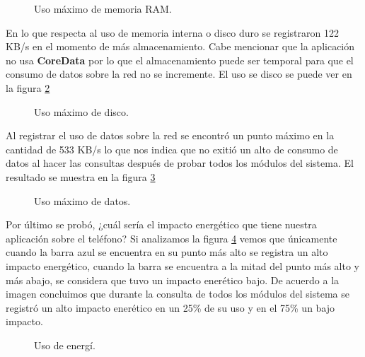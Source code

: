     \begin{figure}[h!]
	\begin{center}
		\caption{Uso máximo de memoria RAM. \label{fig:memoria}}
	\end{center}
\end{figure}

En lo que respecta al uso de memoria interna o disco duro se registraron 122 KB/s en el momento de más almacenamiento. Cabe mencionar que la aplicación no usa \textbf{CoreData} por lo que el almacenamiento puede ser temporal para que el consumo de datos sobre la red no se incremente. El uso se disco se puede ver en la figura \ref{fig:disco} 

    \begin{figure}[h!]
	\begin{center}
		\caption{Uso máximo de disco. \label{fig:disco}}
	\end{center}
\end{figure}

\newpage 
Al registrar el uso de datos sobre la red se encontró un punto máximo en la cantidad de 533 KB/s lo que nos indica que no exitió un alto de consumo de datos al hacer las consultas después de probar todos los módulos del sistema. El resultado se muestra en la figura \ref{fig:datos}

\begin{figure}[h!]
	\begin{center}
		\caption{Uso máximo de datos. \label{fig:datos}}
	\end{center}
\end{figure}

Por último se probó, ¿cuál sería el impacto energético que tiene nuestra aplicación sobre el teléfono? Si analizamos la figura \ref{fig:energia} vemos que únicamente cuando la barra azul se encuentra en su punto más alto se registra un alto impacto energético, cuando la barra se encuentra a la mitad del punto más alto y más abajo, se considera que tuvo un impacto enerético bajo. De acuerdo a la imagen concluimos que durante la consulta de todos los módulos del sistema se registró un alto impacto enerético en un 25\% de su uso y en el 75\% un bajo impacto.

\begin{figure}[h!]
	\begin{center}
		\caption{Uso de energí. \label{fig:energia}}
	\end{center}
\end{figure}